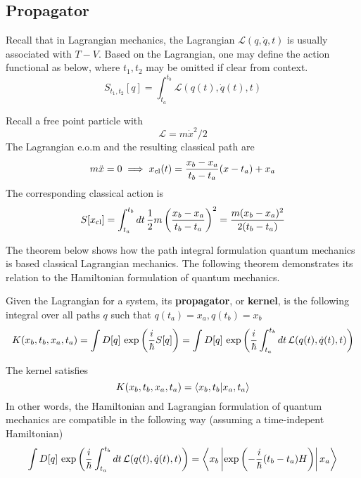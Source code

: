 \subsection{Propagator}
Recall that in Lagrangian mechanics, the Lagrangian \(\mathcal L(q, \dot q, t)\) is usually 
associated with \(T-V\). Based on the Lagrangian, one may define the action functional as below, where \(t_1, t_2\) 
may be omitted if clear from context. 
\[S_{t_1, t_2}[q]=\int_{t_a}^{t_b} \mathcal L(q(t), \dot q(t), t)\]
\begin{example}
    Recall a free point particle with 
    \[\mathcal L = m\dot x^2/2\]
    The Lagrangian e.o.m and the resulting classical path are
    \[m\ddot x = 0\implies x_{\mathrm{cl}}(t)=\dfrac{x_b-x_a}{t_b-t_a}(x-t_a)+x_a\]
    The corresponding classical action is 
    \[S[x_{\mathrm{cl}}] = 
        \int_{t_a}^{t_b} dt\, \dfrac 1 2 m \left(\dfrac{x_b-x_a}{t_b-t_a}\right)^2
        = \dfrac{m(x_b-x_a)^2}{2(t_b-t_a)}\]
\end{example}

The theorem below shows how the path integral formulation quantum mechanics is based 
classical Lagrangian mechanics. The following theorem demonstrates its relation to 
the Hamiltonian formulation of quantum mechanics.

\begin{definition}[propagator]
    Given the Lagrangian for a system, its \textbf{propagator}, or \textbf{kernel}, is 
    the following integral over all paths \(q\) such that \(q(t_a)=x_a, q(t_b)=x_b\)
    \begin{equation}\label{eqn:def_propagator}
        K(x_b, t_b, x_a, t_a)=\int D[q]\, \exp\left(\dfrac i \hbar S[q]\right)
        =\int D[q]\, \exp\left(\dfrac i \hbar \int_{t_a}^{t_b}dt\, \mathcal L(q(t), \dot q(t), t)\right)
    \end{equation}
\end{definition}
    
\begin{theorem}
    The kernel satisfies \[K(x_b, t_b, x_a, t_a)=\left\langle x_b, t_b|x_a, t_a \right\rangle\]
    In other words, the Hamiltonian and Lagrangian formulation of quantum mechanics are 
    compatible in the following way (assuming a time-indepent Hamiltonian)
    \begin{equation}\label{eqn:propagator_hamiltonian}
        \int D[q]\, \exp\left(\dfrac i \hbar \int_{t_a}^{t_b}dt\, \mathcal L(q(t), \dot q(t), t)\right)
        = \left\langle x_b\left|\exp\left(-\dfrac i {\hbar} (t_b-t_a)H\right)\right|x_a \right\rangle 
    \end{equation}
\end{theorem}

